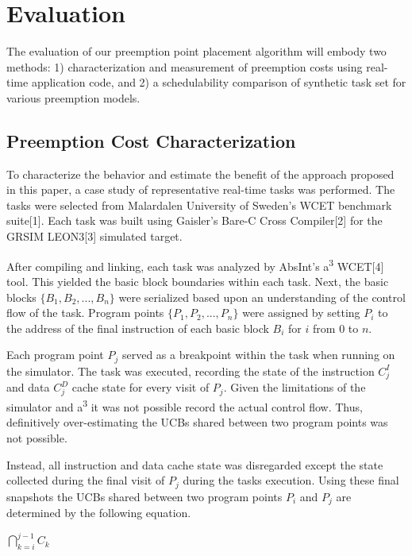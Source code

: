 \section{Evaluation}\label{sec:evaluation}

The evaluation of our preemption point placement algorithm will embody two methods: 1) characterization and measurement of preemption costs using real-time application code, and 2) a schedulability comparison of synthetic task set for various preemption models.

\subsection {Preemption Cost Characterization}\label{sec:preemption_cost_measurement}
To characterize the behavior and estimate the benefit of the approach
proposed in this paper, a case study of representative real-time tasks was
performed. The tasks were selected from Malardalen University of
Sweden's WCET benchmark suite[1]. Each task was built using Gaisler's
Bare-C Cross Compiler[2] for the GRSIM LEON3[3] simulated target.

After compiling and linking, each task was analyzed by AbsInt's
a\textsuperscript{3} WCET[4] tool. This yielded the basic block
boundaries within each task. Next, the basic blocks
${\{B_1, B_2, ..., B_n\}}$ were serialized based upon an understanding of
the control flow of the task. Program points
${\{P_1, P_2, ..., P_n\}}$ were assigned by setting ${P_i}$ to the
address of the final instruction of each basic block ${B_i}$ for ${i}$
from ${0}$ to ${n}$.

Each program point ${P_j}$ served as a breakpoint within the task when
running on the simulator. The task was executed, recording the state of
the instruction ${C^I_j}$ and data ${C^D_j}$ cache state for every
visit of ${P_j}$. Given the limitations of the simulator and
a\textsuperscript{3} it was not possible record the actual control
flow. Thus, definitively over-estimating the UCBs shared between two
program points was not possible.

Instead, all instruction and data cache state was disregarded except
the state collected during the final visit of ${P_j}$ during the tasks
execution. Using these final snapshots the UCBs shared between two
program points ${P_i}$ and ${P_j}$ are determined by the following
equation.

\begin{center}
  ${\bigcap_{k=i}^{j-1} C_k}$
\end{center}

